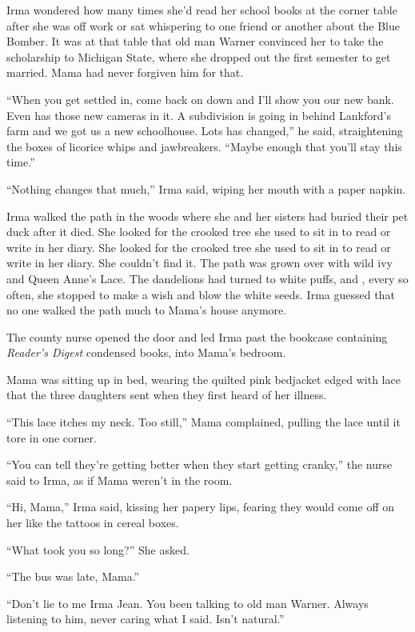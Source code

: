 \documentclass[
]{article}
\begin{document}
Irma wondered how many times she'd read her school books at the corner
table after she was off work or sat whispering to one friend or another
about the Blue Bomber. It was at that table that old man Warner
convinced her to take the scholarship to Michigan State, where she
dropped out the first semester to get married. Mama had never forgiven
him for that.

``When you get settled in, come back on down and I'll show you our new
bank. Even has those new cameras in it. A subdivision is going in behind
Lankford's farm and we got us a new schoolhouse. Lots has changed,'' he
said, straightening the boxes of licorice whips and jawbreakers. ``Maybe
enough that you'll stay this time.''

``Nothing changes that much,'' Irma said, wiping her mouth with a paper
napkin.

Irma walked the path in the woods where she and her sisters had buried
their pet duck after it died. She looked for the crooked tree she used
to sit in to read or write in her diary. She looked for the crooked tree
she used to sit in to read or write in her diary. She couldn't find it.
The path was grown over with wild ivy and Queen Anne's Lace. The
dandelions had turned to white puffs, and , every so often, she stopped
to make a wish and blow the white seeds. Irma guessed that no one walked
the path much to Mama's house anymore.

The county nurse opened the door and led Irma past the bookcase
containing \emph{Reader's Digest} condensed books, into Mama's bedroom.

Mama was sitting up in bed, wearing the quilted pink bedjacket edged
with lace that the three daughters sent when they first heard of her
illness.

``This lace itches my neck. Too still,'' Mama complained, pulling the
lace until it tore in one corner.

``You can tell they're getting better when they start getting cranky,''
the nurse said to Irma, as if Mama weren't in the room.

``Hi, Mama,'' Irma said, kissing her papery lips, fearing they would
come off on her like the tattoos in cereal boxes.

``What took you so long?'' She asked.

``The bus was late, Mama.''

``Don't lie to me Irma Jean. You been talking to old man Warner. Always
listening to him, never caring what I said. Isn't natural.''
\end{document}
